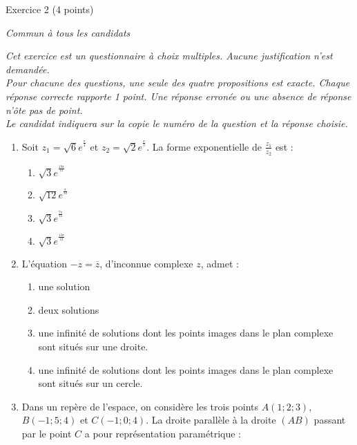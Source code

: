 
%
\begin{h2}Exercice 2   (4 points)\end{h2}
\textit{Commun à tous les candidats}
\par
\textit{Cet exercice est un questionnaire à choix multiples. Aucune justification n'est demandée. 
\\Pour chacune des questions, une seule des quatre propositions est exacte. Chaque réponse correcte rapporte 1 point. Une réponse erronée ou une absence de réponse n'ôte pas de point. 
\\Le candidat indiquera sur la copie le numéro de la question et la réponse choisie.}
\begin{enumerate}
     \item
     Soit $z_{1}=\sqrt{6} e^{^{\frac{\pi }{4}}}$ et $z_{2}=\sqrt{2} e^{^{\frac{\pi }{3}}}$. La forme exponentielle de $\frac{z_{1}}{z_{2}}$ est :
     \begin{enumerate}[label=\alph*.]
          \item
          $\sqrt{3} e^{^{\frac{19\pi }{12}}}$
          \item
          $\sqrt{12} e^{^{\frac{\pi }{12}}}$
          \item
          $\sqrt{3}e^{^{\frac{7\pi }{12}}}$
          \item
          $\sqrt{3}e^{^{\frac{13\pi }{12}}}$
     \end{enumerate}
     \item
     L'équation $-z=\overline{z}$, d'inconnue complexe $z$, admet :
     \begin{enumerate}[label=\alph*.]
          \item
          une solution
          \item
          deux solutions
          \item
          une infinité de solutions dont les points images dans le plan complexe sont situés sur une droite.
          \item
     une infinité de solutions dont les points images dans le plan complexe sont situés sur un cercle.\end{enumerate}
     \item
     Dans un repère de l'espace, on considère les trois points $A\left(1;2;3\right)$, $B\left(-1;5;4\right)$ et $C\left(-1;0;4\right)$. La droite parallèle à la droite $\left(AB\right)$ passant par le point $C$ a pour représentation paramétrique :

\end{enumerate}

